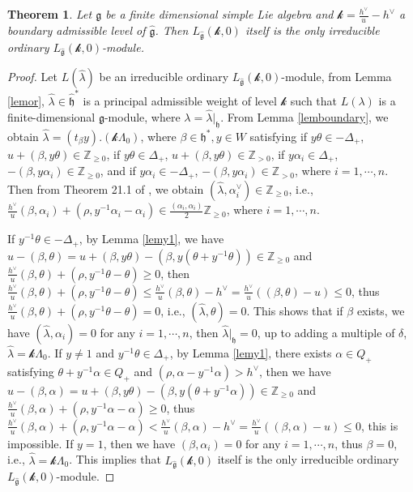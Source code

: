 \documentclass[12pt]{article}
\newtheorem{thm}{Theorem}[section]
\begin{document}
\begin{thm}
Let $\mathfrak{g}$ be a finite dimensional simple Lie algebra and
$\mathcal{k}=\frac{h^{\vee}}{u}-h^{\vee}$ a boundary admissible level of $\widehat{\mathfrak{g}}$.
Then $L_{\widehat{\mathfrak{g}}}(\mathcal{k},0)$ itself is the only irreducible ordinary $L_{\widehat{\mathfrak{g}}}(\mathcal{k},0)$-module.
\end{thm}
\begin{proof}
Let $L(\hat{\lambda})$ be an irreducible ordinary $L_{\widehat{\mathfrak{g}}}(\mathcal{k},0)$-module,
from Lemma \ref{lemor}, $\hat{\lambda}\in \widehat{\mathfrak{h}}^*$ is a principal admissible weight of level $\mathcal{k}$ such that $L(\lambda)$
is a finite-dimensional $\mathfrak{g}$-module, where $\lambda=\hat{\lambda}|_{\mathfrak{h}}$.
From Lemma \ref{lemboundary}, we obtain $\hat{\lambda}=(t_\beta y).(\mathcal{k}\Lambda_0)$,
where $\beta\in \mathfrak{h}^*, y\in W$
satisfying if $y\theta\in -\Delta_+$, $u+(\beta,y\theta)\in\mathbb{Z}_{\geq0}$,
if $y\theta\in \Delta_+$, $u+(\beta,y\theta)\in\mathbb{Z}_{>0}$,
if $y\alpha_i\in \Delta_+$, $-(\beta,y\alpha_i)\in\mathbb{Z}_{\geq0}$, and
if $y\alpha_i\in -\Delta_+$, $-(\beta,y\alpha_i)\in\mathbb{Z}_{>0}$,
where $i=1,\cdots,n$.
Then from Theorem 21.1 of \cite{Hum78}, we obtain
$(\hat{\lambda}, \alpha_i^\vee)\in \mathbb{Z}_{\geq0}$, i.e., $\frac{h^\vee}{u}(\beta,\alpha_i)+(\rho,y^{-1}\alpha_i-\alpha_i)\in \frac{(\alpha_i,\alpha_i)}{2}\mathbb{Z}_{\geq0}$, where $i=1,\cdots,n$.

If $y^{-1}\theta\in -\Delta_+$, by Lemma \ref{lemy1},
we have $u-(\beta,\theta)= u+(\beta,y\theta)-(\beta,y(\theta+y^{-1}\theta))\in\mathbb{Z}_{\geq0}$
and $\frac{h^\vee}{u}(\beta,\theta)+(\rho,y^{-1}\theta-\theta)\geq0$,
then $\frac{h^\vee}{u}(\beta,\theta)+(\rho,y^{-1}\theta-\theta)\leq \frac{h^\vee}{u}(\beta,\theta)-h^\vee
=\frac{h^\vee}{u}((\beta,\theta)-u)\leq 0$,
thus $\frac{h^\vee}{u}(\beta,\theta)+(\rho,y^{-1}\theta-\theta)=0$,
i.e., $(\hat{\lambda}, \theta)=0$. This shows that if $\beta$ exists,
we have $(\hat{\lambda}, \alpha_i)=0$ for any $i=1,\cdots,n$, then $\hat{\lambda}|_{\mathfrak{h}}=0$, up to adding a multiple of $\delta$, $\hat{\lambda}=\mathcal{k}\Lambda_0$.
If $y\ne 1$ and $y^{-1}\theta\in \Delta_+$, by Lemma \ref{lemy1}, there exists $\alpha\in Q_+$ satisfying $\theta+y^{-1}\alpha\in Q_+$ and $(\rho,\alpha-y^{-1}\alpha)> h^\vee$,
then we have $u-(\beta,\alpha)= u+(\beta,y\theta)-(\beta,y(\theta+y^{-1}\alpha))\in\mathbb{Z}_{\geq0}$ and $\frac{h^\vee}{u}(\beta,\alpha)+(\rho,y^{-1}\alpha-\alpha)\geq0$, thus $\frac{h^\vee}{u}(\beta,\alpha)+(\rho,y^{-1}\alpha-\alpha)< \frac{h^\vee}{u}(\beta,\alpha)-h^\vee
=\frac{h^\vee}{u}((\beta,\alpha)-u)\leq 0$,
this is impossible.
If $y=1$, then we have $(\beta,\alpha_i)=0$ for any $i=1,\cdots,n$, thus $\beta=0$, i.e., $\hat{\lambda}=\mathcal{k}\Lambda_0$.
This implies that $L_{\widehat{\mathfrak{g}}}(\mathcal{k},0)$ itself is the only irreducible ordinary $L_{\widehat{\mathfrak{g}}}(\mathcal{k},0)$-module.
\end{proof}
\end{document}
